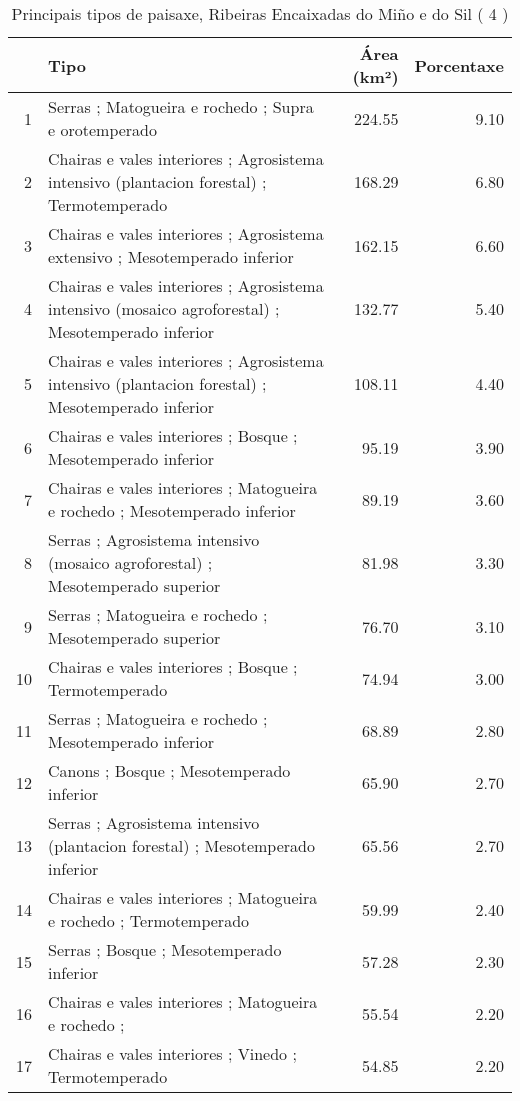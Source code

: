 \begin{table}[p]
\centering
\caption{Principais tipos de paisaxe,  Ribeiras Encaixadas do Miño e do Sil ( 4 )} 
\label{Tipos 4}
\begin{tabular}{rlrr}
  \hline
 & Tipo & Área (km²) & Porcentaxe \\ 
  \hline
1 & Serras ; Matogueira e rochedo ; Supra e orotemperado & 224.55 & 9.10 \\ 
  2 & Chairas e vales interiores ; Agrosistema intensivo (plantacion forestal) ; Termotemperado & 168.29 & 6.80 \\ 
  3 & Chairas e vales interiores ; Agrosistema extensivo ; Mesotemperado inferior & 162.15 & 6.60 \\ 
  4 & Chairas e vales interiores ; Agrosistema intensivo (mosaico agroforestal) ; Mesotemperado inferior & 132.77 & 5.40 \\ 
  5 & Chairas e vales interiores ; Agrosistema intensivo (plantacion forestal) ; Mesotemperado inferior & 108.11 & 4.40 \\ 
  6 & Chairas e vales interiores ; Bosque ; Mesotemperado inferior & 95.19 & 3.90 \\ 
  7 & Chairas e vales interiores ; Matogueira e rochedo ; Mesotemperado inferior & 89.19 & 3.60 \\ 
  8 & Serras ; Agrosistema intensivo (mosaico agroforestal) ; Mesotemperado superior & 81.98 & 3.30 \\ 
  9 & Serras ; Matogueira e rochedo ; Mesotemperado superior & 76.70 & 3.10 \\ 
  10 & Chairas e vales interiores ; Bosque ; Termotemperado & 74.94 & 3.00 \\ 
  11 & Serras ; Matogueira e rochedo ; Mesotemperado inferior & 68.89 & 2.80 \\ 
  12 & Canons ; Bosque ; Mesotemperado inferior & 65.90 & 2.70 \\ 
  13 & Serras ; Agrosistema intensivo (plantacion forestal) ; Mesotemperado inferior & 65.56 & 2.70 \\ 
  14 & Chairas e vales interiores ; Matogueira e rochedo ; Termotemperado & 59.99 & 2.40 \\ 
  15 & Serras ; Bosque ; Mesotemperado inferior & 57.28 & 2.30 \\ 
  16 & Chairas e vales interiores ; Matogueira e rochedo ;  & 55.54 & 2.20 \\ 
  17 & Chairas e vales interiores ; Vinedo ; Termotemperado & 54.85 & 2.20 \\ 

\end{tabular}
\end{table}
